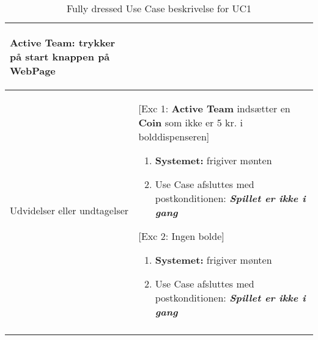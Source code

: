 \documentclass[Kravspecifikation/Kravspec_Main.tex]{subfiles}
\begin{document}
\begin{longtable}[]{@{}ll@{}}
\begin{minipage}[t]{0.47\columnwidth}
\begin{enumerate}
  {\textbf{Active Team:} trykker på start knappen på WebPage}
\end{enumerate}\strut
\end{minipage}\tabularnewline
\toprule
\begin{minipage}[t]{0.47\columnwidth}\raggedright
{Udvidelser eller undtagelser}\strut
\end{minipage} & \begin{minipage}[t]{0.47\columnwidth}\raggedright
{[Exc 1: \textbf{Active Team} indsætter en \textbf{Coin} som ikke er 5 kr. i bolddispenseren]}
\begin{enumerate}
\tightlist
\item \textbf{Systemet:} frigiver mønten
\item Use Case afsluttes med postkonditionen:  \textbf{\textit{Spillet er ikke i gang}}
\end{enumerate}
{[Exc 2: Ingen bolde]}
\begin{enumerate}
\tightlist
\item \textbf{Systemet:} frigiver mønten
\item Use Case afsluttes med postkonditionen:  \textbf{\textit{Spillet er ikke i gang}}
\end{enumerate}
{}\strut
\end{minipage}\tabularnewline
\bottomrule
\bottomrule
\caption{Fully dressed Use Case beskrivelse for UC1}
\label{tab:UC1}
\end{longtable}
\end{document}
